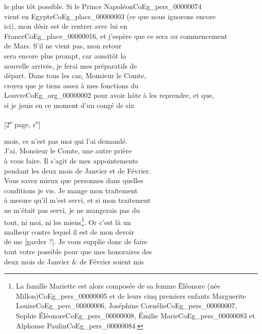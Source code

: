 \documentclass{book}
\begin{document}
le plus tôt possible. Si le Prince Napoléon\gls{CoEg_pers_00000074}\\
vient en Egypte\gls{CoEg_place_00000003} (ce que nous ignorons encore\\
ici), mon désir est de rentrer avec lui en\\
France\gls{CoEg_place_00000016}, et j’espère que ce sera au commencement\\
de Mars. S’il ne vient pas, mon retour\\
sera encore plus prompt, car aussitôt la\\
nouvelle arrivée, je ferai mes préparatifs de\\
départ. Dans tous les cas, Monsieur le Comte,\\
croyez que je tiens assez à mes fonctions du\\
Louvre\gls{CoEg_org_00000002} pour avoir hâte à les reprendre, et que,\\
si je jouis en ce moment d’un congé de six
{\footnotesize \begin{center} [2\textsuperscript{e} page, r\textsuperscript{o}]\end{center}}
\noindent mois, ce n’est pas moi qui l’ai demandé.\\
\indent J’ai, Monsieur le Comte, une autre prière\\
à vous faire. Il s’agit de mes appointements\\
pendant les deux mois de Janvier et de Février.\\
Vous savez mieux que personnes dans quelles\\
conditions je vis. Je mange mon traitement\\
à mesure qu’il m’est servi, et si mon traitement\\
ne m’était pas servi, je ne mangerais pas du\\
tout, ni moi, ni les miens\footnote{La famille Mariette est alors composée de sa femme Êléonore (née Millon)\gls{CoEg_pers_00000005} et de leurs cinq premiers enfants Marguerite Louise\gls{CoEg_pers_00000006}, Joséphine Cornélie\gls{CoEg_pers_00000007}, Sophie Éléonore\gls{CoEg_pers_00000008}, Émilie Marie\gls{CoEg_pers_00000083} et Alphonse Paulin\gls{CoEg_pers_00000084}.}. Or c’est là un\\
malheur contre lequel il est de mon devoir\\
de me [garder ?]. Je vous supplie donc de faire\\
tout votre possible pour que mes honoraires des\\
deux mois de Janvier \& de Février soient mis\\
\end{document}
